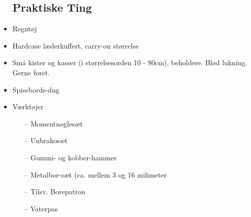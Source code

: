 \documentclass{article}
\begin{document}
\begin{itemize}
\subsection{Praktiske Ting}
    \item Regntøj
    \item Hardcase læderkuffert, carry-on størrelse
    \item Små kister og kasser (i størrelsesorden 10 - 80cm), beholdere. Blød lukning. Gerne foret.
    \item Spisebords-dug
    \item Værktøjer
         \begin{itemize}
            \item[--]   Momentnøglesæt
            \item[--]   Unbrakosæt
            \item[--]   Gummi- og kobber-hammer
            \item[--]   Metalbor-sæt (ca. mellem 3 og 16 milimeter
            \item[--]   Tilsv. Borepatron
            \item[--]   Vaterpas
        \end{itemize}
\newpage 

\end{itemize}
\end{document}
